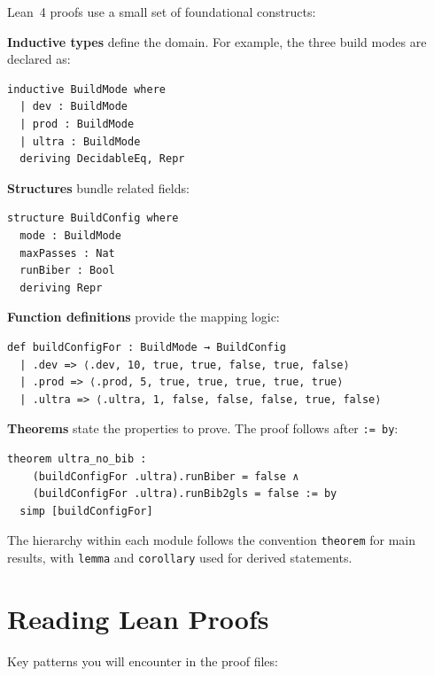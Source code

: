 Lean~4 proofs use a small set of foundational constructs:

\textbf{Inductive types} define the domain.  For example, the three build
modes are declared as:

\begin{verbatim}
inductive BuildMode where
  | dev : BuildMode
  | prod : BuildMode
  | ultra : BuildMode
  deriving DecidableEq, Repr
\end{verbatim}

\textbf{Structures} bundle related fields:

\begin{verbatim}
structure BuildConfig where
  mode : BuildMode
  maxPasses : Nat
  runBiber : Bool
  deriving Repr
\end{verbatim}

\textbf{Function definitions} provide the mapping logic:

\begin{verbatim}
def buildConfigFor : BuildMode → BuildConfig
  | .dev => ⟨.dev, 10, true, true, false, true, false⟩
  | .prod => ⟨.prod, 5, true, true, true, true, true⟩
  | .ultra => ⟨.ultra, 1, false, false, false, true, false⟩
\end{verbatim}

\textbf{Theorems} state the properties to prove.  The proof follows after
\texttt{:= by}:

\begin{verbatim}
theorem ultra_no_bib :
    (buildConfigFor .ultra).runBiber = false ∧
    (buildConfigFor .ultra).runBib2gls = false := by
  simp [buildConfigFor]
\end{verbatim}

The hierarchy within each module follows the convention
\texttt{theorem} for main results, with \texttt{lemma} and
\texttt{corollary} used for derived statements.

\section{Reading Lean Proofs}

Key patterns you will encounter in the proof files:


